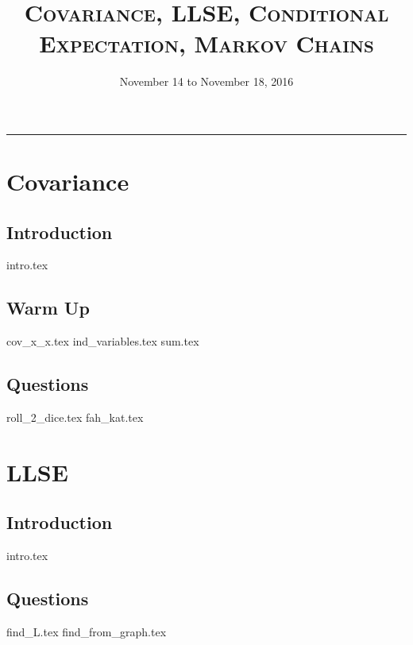 \documentclass{exam}
\title{\textsc{Covariance,  LLSE, Conditional  Expectation, Markov Chains}}
\date{November 14 to November 18, 2016}
\begin{document}
\maketitle
\rule{\textwidth}{0.15em}
\fontsize{12}{15}\selectfont
\thispagestyle{empty}

\section{Covariance}
\subsection{Introduction}
{intro.tex}
\subsection{Warm Up}
\begin{questions}
{cov_x_x.tex}
{ind_variables.tex}
{sum.tex}
\end{questions}

\subsection{Questions}
\begin{questions}
{roll_2_dice.tex}
{fah_kat.tex}
\end{questions}

\section{LLSE}
\subsection{Introduction}
{intro.tex}
\subsection{Questions}
\begin{questions}
{find_L.tex}
{find_from_graph.tex}
\end{questions}
\end{document}
